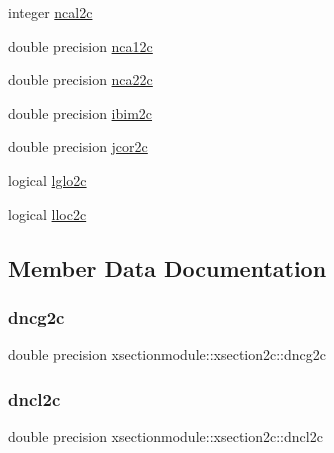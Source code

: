 \begin{DoxyCompactItemize}
\item 
integer \hyperlink{structxsectionmodule_1_1xsection2c_a2bd1c4ef42c43f313a31e7047c5f768d}{ncal2c}
\item 
double precision \hyperlink{structxsectionmodule_1_1xsection2c_a1301bae8be49f853e9e6e1a57ddb4b5a}{nca12c}
\item 
double precision \hyperlink{structxsectionmodule_1_1xsection2c_afb65541617a5541ddd65ca4c58debac1}{nca22c}
\item 
double precision \hyperlink{structxsectionmodule_1_1xsection2c_a59feb13bb87317be908f287a858105e0}{ibim2c}
\item 
double precision \hyperlink{structxsectionmodule_1_1xsection2c_a9025e8d27d5f94a423ff61d8ef911a1f}{jcor2c}
\item 
logical \hyperlink{structxsectionmodule_1_1xsection2c_aba2973f4d70db7913358398fcd2e2500}{lglo2c}
\item 
logical \hyperlink{structxsectionmodule_1_1xsection2c_a326f1c812469375b81ec903df1e7493a}{lloc2c}
\end{DoxyCompactItemize}


\subsection{Member Data Documentation}
\mbox{\label{structxsectionmodule_1_1xsection2c_a45d6b3b52f169206eb5bd16ada9fd034}} 
\subsubsection{\texorpdfstring{dncg2c}{dncg2c}}
{\footnotesize\ttfamily double precision xsectionmodule\+::xsection2c\+::dncg2c}

\mbox{\label{structxsectionmodule_1_1xsection2c_a8d8a5d3e11cc022a84233d44bad2fbb9}} 
\subsubsection{\texorpdfstring{dncl2c}{dncl2c}}
{\footnotesize\ttfamily double precision xsectionmodule\+::xsection2c\+::dncl2c}

